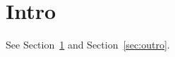 \documentclass{article}
\begin{document}
\section{Intro}\label{sec:intro}
See Section~\ref{sec:intro} and Section~\ref{sec:outro}.
\end{document}
